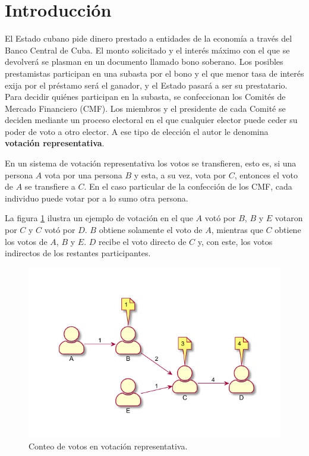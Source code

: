 \chapter*{Introducción}\label{chapter:introduction}



El Estado cubano pide dinero prestado a entidades de la econom\'ia a trav\'es del Banco Central de Cuba. El monto solicitado y el inter\'es m\'aximo con el que se devolver\'a se plasman en un documento llamado bono soberano.  Los posibles prestamistas participan en una subasta por el bono y el que menor tasa de inter\'es exija por el pr\'estamo ser\'a el ganador, y el Estado pasar\'a a ser su prestatario.  Para decidir qui\'enes participan en la subasta, se confeccionan los Comit\'es de Mercado Financiero (CMF).  Los miembros y el presidente de cada Comit\'e se deciden mediante un proceso electoral en el que cualquier elector puede ceder su poder de voto a otro elector. A ese tipo de elecci\'on el autor le denomina \textbf{votaci\'on representativa}.  


En un sistema de votaci\'on representativa  los votos se transfieren, esto es, si una persona $A$ vota por una persona $B$ y esta, a su vez, vota por  $C$, entonces el voto de $A$ se transfiere a $C$. En el caso particular de la confecci\'on de los CMF, cada individuo puede votar por a lo sumo otra persona.

La figura \ref{fig:r-voting} ilustra un ejemplo de votación en el que $A$ votó por $B$, $B$ y $E$ votaron por $C$ y $C$ votó por $D$. $B$ obtiene solamente el voto de $A$, mientras que $C$ obtiene los votos de $A$, $B$ y $E$. $D$ recibe el voto directo de $C$ y, con este,  los votos indirectos de los restantes participantes.

\begin{figure}[h]
    \centering
    \includegraphics{Graphics/rep-voting.pdf}
    \caption{Conteo de votos en votación representativa.}
    \label{fig:r-voting}
\end{figure}


